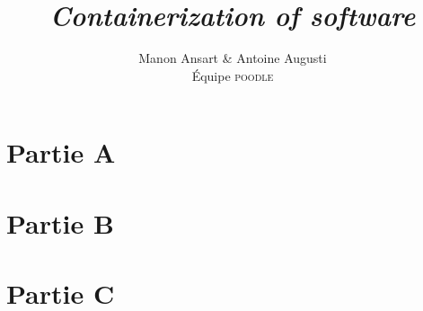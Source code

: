 \documentclass[a4paper, 12pt, french, titlepage]{scrartcl}
\title{\textit{Containerization of software}}
\author{Manon Ansart \& Antoine Augusti\\Équipe \textsc{poodle}}
\date{}
\begin{document}
    \maketitle

    \section*{Partie A}
        

    \section*{Partie B}
        

    \section*{Partie C}
        

    
    
\end{document}

